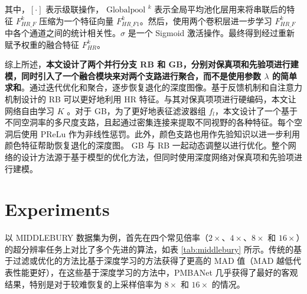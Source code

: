 \documentclass{vip-theme}
\begin{document}
其中，$[\cdot]$ 表示级联操作，$\text { Globalpool }^{k}$ 表示全局平均池化层用来将串联后的特征 $F_{HR\_F}^k$ 压缩为一个特征向量 $F_{HR\_F1}^k$。然后，使用两个卷积层进一步学习 $F_{HR\_F}^k$ 中各个通道之间的统计相关性。$\sigma$ 是一个 Sigmoid 激活操作。最终得到经过重新赋予权重的融合特征 $F_{HR}^k$。


综上所述，\textbf{本文设计了两个并行分支 RB 和 GB，分别对保真项和先验项进行建模，同时引入了一个融合模块来对两个支路进行聚合，而不是使用参数 $\lambda$ 的简单求和}。通过迭代优化和聚合，逐步恢复退化的深度图像。基于反馈机制和自注意力机制设计的 RB 可以更好地利用 HR 特征。与其对保真项项进行硬编码，本文让网络自由学习 $K$ 。对于 GB，为了更好地表征滤波器组 $f_l$，本文设计了一个基于不同空洞率的多尺度支路，且起通过密集连接来提取不同视野的各种特征。每个空洞后使用 PReLu 作为非线性惩罚。此外，颜色支路也用作先验知识以进一步利用颜色特征帮助恢复退化的深度图。 GB 与 RB 一起动态调整以进行优化。整个网络的设计方法源于基于模型的优化方法，但同时使用深度网络对保真项和先验项进行建模。

\section{Experiments}
\label{experimentes}

以 MIDDLEBURY 数据集为例，首先在四个常见倍率（$2\times$、$4\times$、$8\times$ 和 $16\times$）的超分辨率任务上对比了多个先进的算法，如表 \ref{tab:middlebury} 所示。传统的基于过滤或优化的方法比基于深度学习的方法获得了更高的 MAD 值（MAD 越低代表性能更好），在这些基于深度学习的方法中，PMBANet 几乎获得了最好的客观结果，特别是对于较难恢复的上采样倍率为 $8\times$ 和 $16\times$ 的情况。
\end{document}
